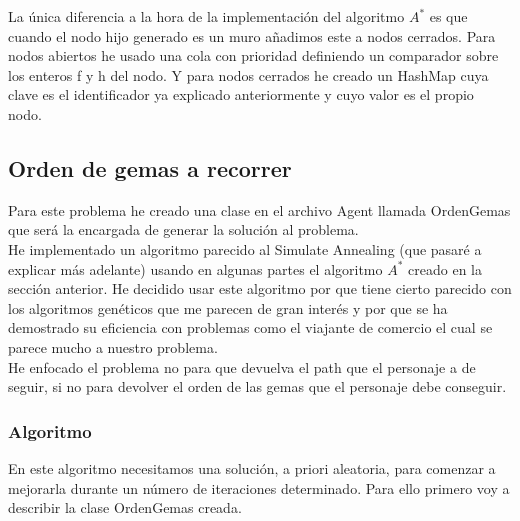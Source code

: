 \documentclass[a4paper,11pt]{article}
\begin{document}
La única diferencia a la hora de la implementación del algoritmo $A^*$ es que cuando el nodo hijo generado es un muro añadimos este a nodos cerrados. Para nodos abiertos he usado una cola con prioridad definiendo un comparador sobre los enteros f y h del nodo. Y para nodos cerrados he creado un HashMap cuya clave es el identificador ya explicado anteriormente y cuyo valor es el propio nodo.

\subsection{Orden de gemas a recorrer}

Para este problema he creado una clase en el archivo Agent llamada OrdenGemas que será la encargada de generar la solución al problema.\\

He implementado un algoritmo parecido al Simulate Annealing (que pasaré a explicar más adelante) usando en algunas partes el algoritmo $A^*$ creado en la sección anterior. He decidido usar este algoritmo por que tiene cierto parecido con los algoritmos genéticos que me parecen de gran interés y por que se ha demostrado su eficiencia con problemas como el viajante de comercio el cual se parece mucho a nuestro problema.\\

He enfocado el problema no para que devuelva el path que el personaje a de seguir, si no para devolver el orden de las gemas que el personaje debe conseguir.

\subsubsection*{Algoritmo}

En este algoritmo necesitamos una solución, a priori aleatoria, para comenzar a mejorarla durante un número de iteraciones determinado. Para ello primero voy a describir la clase OrdenGemas creada.\\
\end{document}
